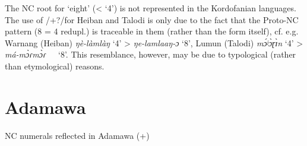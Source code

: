 The NC root for ‘eight’ (< ‘4’) is not represented in the Kordofanian languages. The use of /+?/for Heiban and Talodi is only due to the fact that the Proto-NC pattern (8 = 4 redupl.) is traceable in them (rather than the form itself), cf. e.g. Warnang (Heiban) \textit{ŋè-làmlàŋ} ‘4’ > \textit{ŋe-lamlaaŋ-ɔ} ‘8’, Lumun (Talodi) \textit{m{\'{ɔ}}ʲ{\`{ɔ}}ɽ{\`{ɪ}}n} ‘4’ > \textit{má-m{\`{ɔ}}ɾm{\`{ɔ}}ɾ}~~~‘8’. This resemblance, however, may be due to typological (rather than etymological) reasons. 


\section{Adamawa}%

\begin{table}
\caption{\label{tab:5:6}NC numerals reflected in Adamawa (+)}
\small


\end{table}
